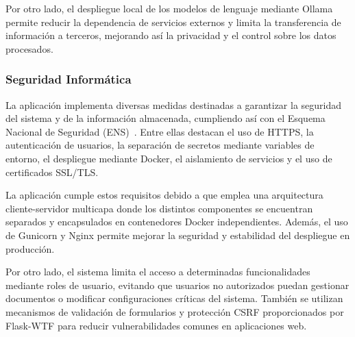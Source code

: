 Por otro lado, el despliegue local de los modelos de lenguaje mediante Ollama permite reducir la dependencia de servicios externos y limita la transferencia de información a terceros, mejorando así la privacidad y el control sobre los datos procesados.

\subsubsection{Seguridad Informática}\label{subsec:seg}

La aplicación implementa diversas medidas destinadas a garantizar la seguridad del sistema y de la información almacenada, cumpliendo así con el Esquema Nacional de Seguridad (ENS)~\cite{legal:ENS}. Entre ellas destacan el uso de HTTPS, la autenticación de usuarios, la separación de secretos mediante variables de entorno, el despliegue mediante Docker, el aislamiento de servicios y el uso de certificados SSL/TLS.

La aplicación cumple estos requisitos debido a que emplea una arquitectura cliente-servidor multicapa donde los distintos componentes se encuentran separados y encapsulados en contenedores Docker independientes. Además, el uso de Gunicorn y Nginx permite mejorar la seguridad y estabilidad del despliegue en producción.

Por otro lado, el sistema limita el acceso a determinadas funcionalidades mediante roles de usuario, evitando que usuarios no autorizados puedan gestionar documentos o modificar configuraciones críticas del sistema. También se utilizan mecanismos de validación de formularios y protección CSRF proporcionados por Flask-WTF para reducir vulnerabilidades comunes en aplicaciones web.

